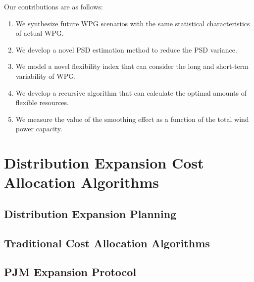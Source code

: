 \documentclass[journal]{IEEEtran} %
\begin{document}
Our contributions are as follows:
\begin{enumerate}	
	\item We synthesize future WPG scenarios with the same statistical characteristics of actual WPG.
	\item We develop a novel PSD estimation method to reduce the PSD variance.	
	\item We model a novel flexibility index that can consider the long and short-term variability of WPG.	
	\item We develop a recursive algorithm that can calculate the optimal amounts of flexible resources.
	\item We measure the value of the smoothing effect as a function of the total wind power capacity.
\end{enumerate}


























\newpage
\section{Distribution Expansion Cost Allocation Algorithms}




\subsection{Distribution Expansion Planning}






\subsection{Traditional Cost Allocation Algorithms}






\newpage
\subsection{PJM Expansion Protocol}
\end{document}

